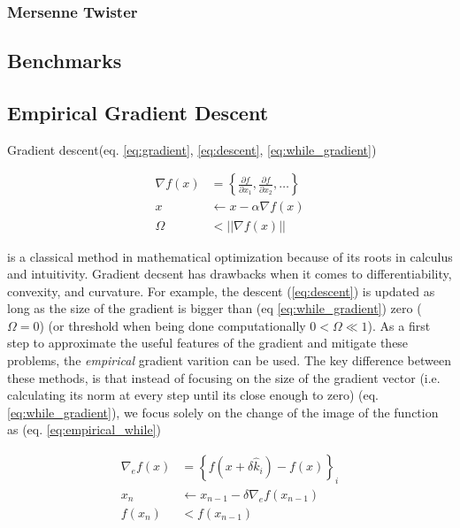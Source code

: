 \documentclass{article}
\begin{document}
            \subsubsection{Mersenne Twister}

        \subsection{Benchmarks}

        \subsection{Empirical Gradient Descent}

            Gradient descent(eq. \ref{eq:gradient}, \ref{eq:descent}, \ref{eq:while_gradient})
            
            \begin{align}
                \label{eq:gradient} \nabla f(x) &= \left\{ \frac{\partial f}{\partial x_1}, \frac{\partial f}{\partial x_2}, \ldots\right\} \\
                \label{eq:descent} x &\leftarrow x - \alpha \nabla f(x) \\
                \label{eq:while_gradient} \Omega &< ||\nabla f(x)||
            \end{align}
            
            is a classical method in mathematical optimization because of its roots in calculus and intuitivity.  Gradient decsent has drawbacks when it comes to differentiability,  convexity, and curvature.  For example, the descent (\ref{eq:descent}) is updated as long as the size of the gradient is bigger than (eq \ref{eq:while_gradient}) zero ($\Omega = 0$) (or threshold when being done computationally $0 < \Omega \ll 1$).  As a first step to approximate the useful features of the gradient and mitigate these problems, the \emph{empirical} gradient varition can be used.  The key difference between these methods, is that instead of focusing on the size of the gradient vector (i.e. calculating its norm at every step until its close enough to zero) (eq. \ref{eq:while_gradient}), we focus solely on the change of the image of the function as (eq. \ref{eq:empirical_while})

            \begin{align}
                \label{eq:empirical_gradient} \nabla_e f(x) &= \left\{f\left(x + \delta \hat{k}_i\right) - f\left(x\right)\right\}_i \\
                \label{empirical_descent} x_{n} &\leftarrow x_{n-1} - \delta \nabla_e f(x_{n-1}) \\
                \label{eq:empirical_while} f(x_{n}) &< f(x_{n-1})
            \end{align}
\end{document}
